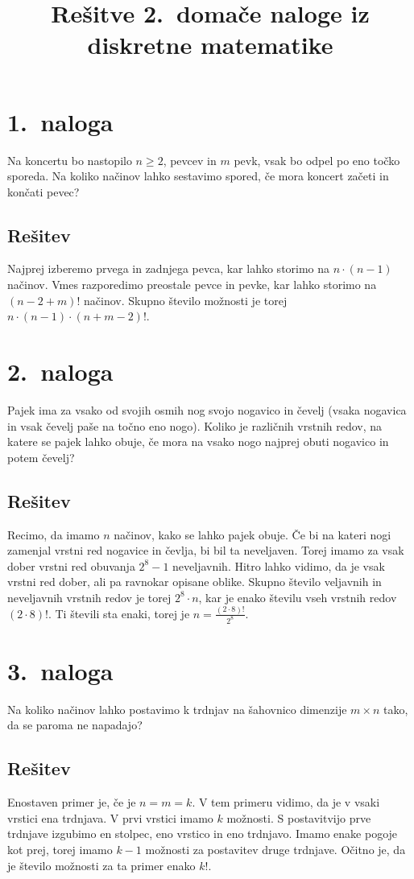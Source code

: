 \documentclass[11pt]{article}
\title{Rešitve 2.\ domače naloge iz diskretne matematike}
\author{}
\date{}
\begin{document}
\maketitle

\section*{1.~naloga}
Na koncertu bo nastopilo \(n \ge 2\), pevcev in \(m\) pevk, vsak bo odpel po eno točko sporeda.
Na koliko načinov lahko sestavimo spored, če mora koncert začeti in končati pevec?
\subsection*{Rešitev}
    Najprej izberemo prvega in zadnjega pevca, kar lahko storimo na \(n \cdot (n - 1)\) načinov. 
    Vmes razporedimo preostale pevce in pevke, kar lahko storimo na \((n - 2 + m)!\) načinov.
    Skupno število možnosti je torej \(n \cdot (n - 1) \cdot (n + m - 2)!\).

\section*{2.~naloga}
Pajek ima za vsako od svojih osmih nog svojo nogavico in čevelj (vsaka nogavica in vsak
čevelj paše na točno eno nogo). Koliko je različnih vrstnih redov, na katere se pajek lahko
obuje, če mora na vsako nogo najprej obuti nogavico in potem čevelj?
\subsection*{Rešitev}
    Recimo, da imamo \(n\) načinov, kako se lahko pajek obuje. Če bi na kateri nogi zamenjal
    vrstni red nogavice in čevlja, bi bil ta neveljaven. Torej imamo za vsak dober vrstni red obuvanja
    \(2^8 - 1\) neveljavnih. Hitro lahko vidimo, da je vsak vrstni red dober, ali pa ravnokar opisane oblike.
    Skupno število veljavnih in neveljavnih vrstnih redov je torej \(2^8 \cdot n\), 
    kar je enako številu vseh vrstnih redov \(\left(2 \cdot 8\right)!\). Ti števili sta enaki, torej je \(n = \frac{\left(2 \cdot 8\right)!}{2^8}\).

\section*{3.~naloga}
Na koliko načinov lahko postavimo k trdnjav na šahovnico dimenzije \(m \times n\) tako, da se
paroma ne napadajo?
\subsection*{Rešitev}
    Enostaven primer je, če je \(n = m = k\). V tem primeru vidimo, da je v vsaki vrstici ena trdnjava.
    V prvi vrstici imamo \(k\) možnosti. S postavitvijo prve trdnjave izgubimo en stolpec, eno vrstico in eno trdnjavo.
    Imamo enake pogoje kot prej, torej imamo \(k - 1\) možnosti za postavitev druge trdnjave. Očitno je, da je število možnosti
    za ta primer enako \(k!\).
\end{document}
